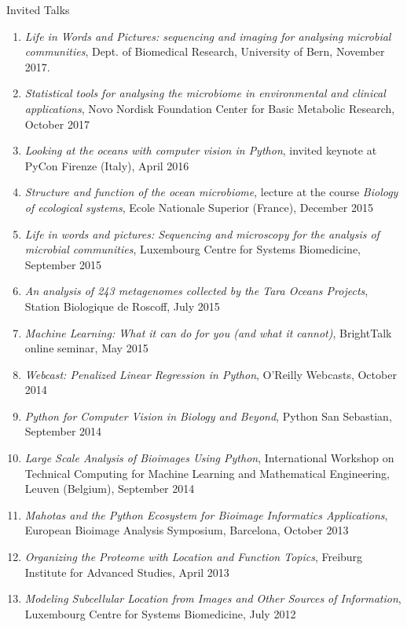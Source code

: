 \documentclass{article}
\renewcommand\subsection[1]{%
    \par\vspace{.1em}%
    {\hspace{1em}\subsubhead #1}%
    \par\vspace{.2em}%
}
\begin{document}
\subsection{Invited Talks}
\begin{enumerate}
\item \emph{Life in Words and Pictures: sequencing and imaging for analysing
    microbial communities}, Dept. of Biomedical Research, University of Bern,
    November 2017.
\item \emph{Statistical tools for analysing the microbiome in environmental and
    clinical applications}, Novo Nordisk Foundation Center for Basic Metabolic
    Research, October 2017
\item \emph{Looking at the oceans with computer vision in Python}, invited
    keynote at PyCon Firenze (Italy), April 2016
\item \emph{Structure and function of the ocean microbiome}, lecture at the
    course \textit{Biology of ecological systems}, Ecole Nationale Superior
    (France), December 2015
\item \emph{Life in words and pictures: Sequencing and microscopy for the analysis
    of microbial communities}, Luxembourg Centre for Systems Biomedicine,
    September 2015
\item \emph{An analysis of 243 metagenomes collected by the Tara Oceans
    Projects}, Station Biologique de Roscoff, July 2015
\item \emph{Machine Learning: What it can do for you (and what it cannot)},
    BrightTalk online seminar, May 2015
\item \emph{Webcast: Penalized Linear Regression in Python}, O'Reilly Webcasts,
    October 2014
\item \emph{Python for Computer Vision in Biology and Beyond}, Python San
    Sebastian, September 2014
\item \emph{Large Scale Analysis of Bioimages Using Python}, International
    Workshop on Technical Computing for Machine Learning and Mathematical
    Engineering, Leuven (Belgium), September 2014
\item \emph{Mahotas and the Python Ecosystem for Bioimage Informatics
Applications}, European Bioimage Analysis Symposium, Barcelona, October 2013
\item \emph{Organizing the Proteome with Location and Function Topics},
Freiburg Institute for Advanced Studies, April 2013
\item \emph{Modeling Subcellular Location from Images and Other Sources of
Information}, Luxembourg Centre for Systems Biomedicine, July 2012

\end{enumerate}
\end{document}
